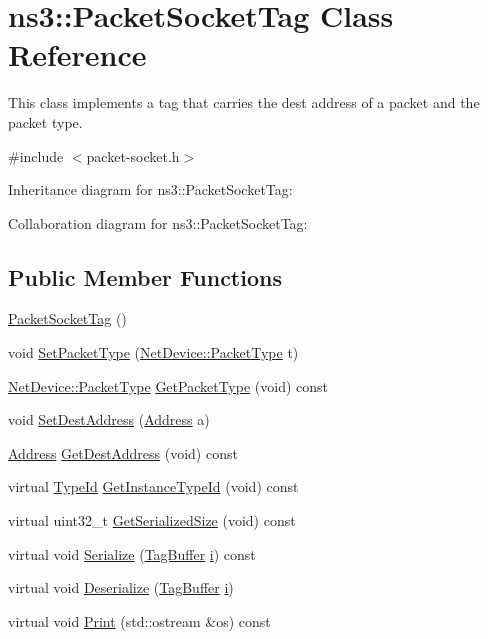 \hypertarget{classns3_1_1PacketSocketTag}{}\section{ns3\+:\+:Packet\+Socket\+Tag Class Reference}
\label{classns3_1_1PacketSocketTag}


This class implements a tag that carries the dest address of a packet and the packet type.  




{\ttfamily \#include $<$packet-\/socket.\+h$>$}



Inheritance diagram for ns3\+:\+:Packet\+Socket\+Tag\+:


Collaboration diagram for ns3\+:\+:Packet\+Socket\+Tag\+:
\subsection*{Public Member Functions}
\begin{DoxyCompactItemize}
\item 
\hyperlink{classns3_1_1PacketSocketTag_aa66f89d5d460d110f5447fe1c03a66a6}{Packet\+Socket\+Tag} ()
\item 
void \hyperlink{classns3_1_1PacketSocketTag_acd24aefb62d805c7aa651af68d4e757e}{Set\+Packet\+Type} (\hyperlink{classns3_1_1NetDevice_ace65153f09144f55a0d3e702fc29d6b2}{Net\+Device\+::\+Packet\+Type} t)
\item 
\hyperlink{classns3_1_1NetDevice_ace65153f09144f55a0d3e702fc29d6b2}{Net\+Device\+::\+Packet\+Type} \hyperlink{classns3_1_1PacketSocketTag_a06150e98b0e21438de70c6c0063297d8}{Get\+Packet\+Type} (void) const 
\item 
void \hyperlink{classns3_1_1PacketSocketTag_aeb18e0f1b78fceee4b91e35b732607b1}{Set\+Dest\+Address} (\hyperlink{classns3_1_1Address}{Address} a)
\item 
\hyperlink{classns3_1_1Address}{Address} \hyperlink{classns3_1_1PacketSocketTag_acba8389f42cbec13f3de8c513a66eb94}{Get\+Dest\+Address} (void) const 
\item 
virtual \hyperlink{classns3_1_1TypeId}{Type\+Id} \hyperlink{classns3_1_1PacketSocketTag_afa3f1ca89a74b47f0322f6d54c44753b}{Get\+Instance\+Type\+Id} (void) const 
\item 
virtual uint32\+\_\+t \hyperlink{classns3_1_1PacketSocketTag_afe6388356f64be7338e9664c926eb549}{Get\+Serialized\+Size} (void) const 
\item 
virtual void \hyperlink{classns3_1_1PacketSocketTag_a3c9d33b2b84fb2b76d6c92c3c6f6dd5f}{Serialize} (\hyperlink{classns3_1_1TagBuffer}{Tag\+Buffer} \hyperlink{lte__uplink__power__control_8m_a6f6ccfcf58b31cb6412107d9d5281426}{i}) const 
\item 
virtual void \hyperlink{classns3_1_1PacketSocketTag_adbb985822134e35e1f516812b2b3e49e}{Deserialize} (\hyperlink{classns3_1_1TagBuffer}{Tag\+Buffer} \hyperlink{lte__uplink__power__control_8m_a6f6ccfcf58b31cb6412107d9d5281426}{i})
\item 
virtual void \hyperlink{classns3_1_1PacketSocketTag_a6afbc396d1f5a607191844b8297d055c}{Print} (std\+::ostream \&os) const 
\end{DoxyCompactItemize}
